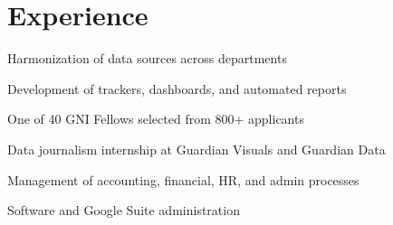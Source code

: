 \documentclass[]{deedy-resume-openfont}
\begin{document}
\begin{minipage}[t]{0.66\textwidth} 

\section{Experience}
\vspace{\topsep} %
\begin{tightemize}
\item Harmonization of data sources across departments
\item Development of trackers, dashboards, and automated reports
\end{tightemize}
\sectionsep

\begin{tightemize}
\item One of 40 GNI Fellows selected from 800+ applicants
\item Data journalism internship at Guardian Visuals and Guardian Data
\end{tightemize}
\sectionsep

\begin{tightemize}
\item Management of accounting, financial, HR, and admin processes
\item Software and Google Suite administration
\end{tightemize}
\sectionsep

\sectionsep

\sectionsep


\end{minipage}
\end{document}
